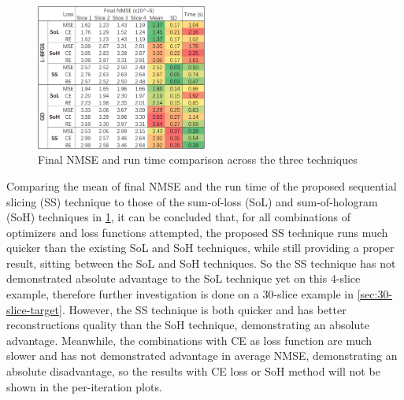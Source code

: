 \begin{figure}[h!]
	\centering
	\includegraphics[width=0.5\textwidth]{Technique_Loss_comparison}
	\caption{Final NMSE and run time comparison across the three techniques}
	\label{fig:Technique_Loss_comparison}
\end{figure}

Comparing the mean of final NMSE and the run time of the proposed sequential slicing (SS) technique to those of the sum-of-loss (SoL) and sum-of-hologram (SoH) techniques in \cref{fig:Technique_Loss_comparison}, it can be concluded that, for all combinations of optimizers and loss functions attempted, the proposed SS technique runs much quicker than the existing SoL and SoH techniques, while still providing a proper result, sitting between the SoL and SoH techniques. So the SS technique has not demonstrated absolute advantage to the SoL technique yet on this 4-slice example, therefore further investigation is done on a 30-slice example in \cref{sec:30-slice-target}. However, the SS technique is both quicker and has better reconstructions quality than the SoH technique, demonstrating an absolute advantage. Meanwhile, the combinations with CE as loss function are much slower and has not demonstrated advantage in average NMSE, demonstrating an absolute disadvantage, so the results with CE loss or SoH method will not be shown in the per-iteration plots.

